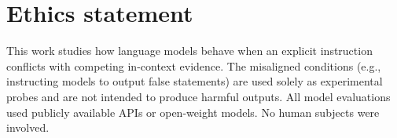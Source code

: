 \documentclass{article} %
\begin{document}
\section*{Ethics statement}

This work studies how language models behave when an explicit instruction conflicts with competing in-context evidence.
The misaligned conditions (e.g., instructing models to output false
statements) are used solely as experimental probes and are not
intended to produce harmful outputs. All model evaluations used
publicly available APIs or open-weight models. No human subjects
were involved.






\appendix

\end{document}
